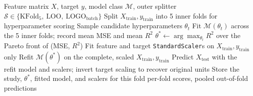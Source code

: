 \documentclass[a4paper,11pt]{article}
\begin{document}
\begin{algorithm}[H]
\caption{ARMOTE-CV nested-tuning procedure, applied independently within each outer fold of each protocol (5-fold, LOO, LOBO)}
\label{alg:armotecv}
\begin{algorithmic}[1]
\Require Feature matrix $X$, target $y$, model class $\mathcal{M}$, outer splitter $\mathcal{S}\in\{\text{KFold}_5,\ \text{LOO},\ \text{LOGO}_{\text{batch}}\}$
    \State Split $X_{\text{train}}, y_{\text{train}}$ into 5 inner folds for hyperparameter scoring
     
        \State Sample candidate hyperparameters $\theta_t$
        \State Fit $\mathcal{M}(\theta_t)$ across the 5 inner folds; record mean MSE and mean $R^2$
    \EndFor
    \State $\theta^\ast \leftarrow \arg\max_{\theta_t} R^2$ over the Pareto front of (MSE, $R^2$)
    \State Fit feature and target \texttt{StandardScaler}s on $X_{\text{train}}, y_{\text{train}}$ only
    \State Refit $\mathcal{M}(\theta^\ast)$ on the complete, scaled $X_{\text{train}}, y_{\text{train}}$
    \State Predict $X_{\text{test}}$ with the refit model and scalers; invert target scaling to recover original units
    \State Store the study, $\theta^\ast$, fitted model, and scalers for this fold
\EndFor
\State \Return per-fold scores, pooled out-of-fold predictions
\end{algorithmic}
\end{algorithm}
\end{document}
